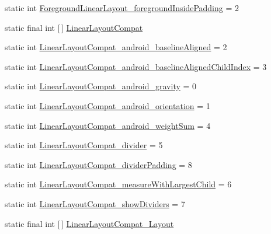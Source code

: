 \begin{DoxyCompactItemize}
\item 
static int \hyperlink{classandroid_1_1support_1_1v7_1_1mediarouter_1_1R_1_1styleable_a99710c55c5f5f29b77ac73ecd8f54630}{Foreground\+Linear\+Layout\+\_\+foreground\+Inside\+Padding} = 2
\item 
static final int \mbox{[}$\,$\mbox{]} \hyperlink{classandroid_1_1support_1_1v7_1_1mediarouter_1_1R_1_1styleable_a47eee9f8c488407b3ea7145bb65c01b9}{Linear\+Layout\+Compat}
\item 
static int \hyperlink{classandroid_1_1support_1_1v7_1_1mediarouter_1_1R_1_1styleable_ae32c36f372f932bad44d2481a642da4c}{Linear\+Layout\+Compat\+\_\+android\+\_\+baseline\+Aligned} = 2
\item 
static int \hyperlink{classandroid_1_1support_1_1v7_1_1mediarouter_1_1R_1_1styleable_ad40362c472388ae048a0f344c697bdc6}{Linear\+Layout\+Compat\+\_\+android\+\_\+baseline\+Aligned\+Child\+Index} = 3
\item 
static int \hyperlink{classandroid_1_1support_1_1v7_1_1mediarouter_1_1R_1_1styleable_a692f390f8126d586f90715ad68d334e4}{Linear\+Layout\+Compat\+\_\+android\+\_\+gravity} = 0
\item 
static int \hyperlink{classandroid_1_1support_1_1v7_1_1mediarouter_1_1R_1_1styleable_ada8e9e4cc920ef1d55ef1492d8ef474a}{Linear\+Layout\+Compat\+\_\+android\+\_\+orientation} = 1
\item 
static int \hyperlink{classandroid_1_1support_1_1v7_1_1mediarouter_1_1R_1_1styleable_a65beefd6258229dc07bd6ee75c3895a1}{Linear\+Layout\+Compat\+\_\+android\+\_\+weight\+Sum} = 4
\item 
static int \hyperlink{classandroid_1_1support_1_1v7_1_1mediarouter_1_1R_1_1styleable_a971e3c277de0c3db5814dd8f86ca0eb6}{Linear\+Layout\+Compat\+\_\+divider} = 5
\item 
static int \hyperlink{classandroid_1_1support_1_1v7_1_1mediarouter_1_1R_1_1styleable_a6f1edd962e5544040cdb17a48e26029a}{Linear\+Layout\+Compat\+\_\+divider\+Padding} = 8
\item 
static int \hyperlink{classandroid_1_1support_1_1v7_1_1mediarouter_1_1R_1_1styleable_aa6040492a9158589fe5eb2883eac10e6}{Linear\+Layout\+Compat\+\_\+measure\+With\+Largest\+Child} = 6
\item 
static int \hyperlink{classandroid_1_1support_1_1v7_1_1mediarouter_1_1R_1_1styleable_a54ae018341bb332d05e8be7723f49be8}{Linear\+Layout\+Compat\+\_\+show\+Dividers} = 7
\item 
static final int \mbox{[}$\,$\mbox{]} \hyperlink{classandroid_1_1support_1_1v7_1_1mediarouter_1_1R_1_1styleable_acb53f9b4011a88095f9391acfa3832fc}{Linear\+Layout\+Compat\+\_\+\+Layout}

\end{DoxyCompactItemize}

